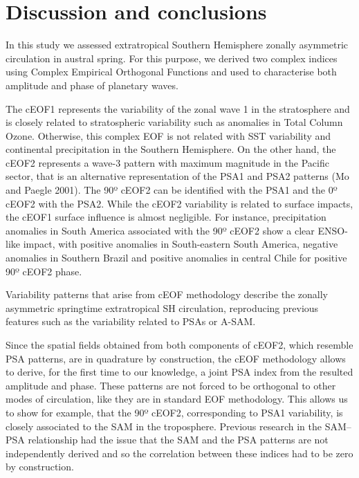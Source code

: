 \documentclass[pdflatex,lineno,sn-basic]{sn-jnl}
\theoremstyle{thmstyleone}%
\theoremstyle{thmstyletwo}%
\theoremstyle{thmstylethree}%
\begin{document}
\hypertarget{discussion}{%
\section{Discussion and conclusions}\label{discussion}}

In this study we assessed extratropical Southern Hemisphere zonally asymmetric circulation in austral spring.
For this purpose, we derived two complex indices using Complex Empirical Orthogonal Functions and used to characterise both amplitude and phase of planetary waves.

The cEOF1 represents the variability of the zonal wave 1 in the stratosphere and is closely related to stratospheric variability such as anomalies in Total Column Ozone.
Otherwise, this complex EOF is not related with SST variability and continental precipitation in the Southern Hemisphere.
On the other hand, the cEOF2 represents a wave-3 pattern with maximum magnitude in the Pacific sector, that is an alternative representation of the PSA1 and PSA2 patterns (Mo and Paegle 2001).
The 90º cEOF2 can be identified with the PSA1 and the 0º cEOF2 with the PSA2.
While the cEOF2 variability is related to surface impacts, the cEOF1 surface influence is almost negligible.
For instance, precipitation anomalies in South America associated with the 90º cEOF2 show a clear ENSO-like impact, with positive anomalies in South-eastern South America, negative anomalies in Southern Brazil and positive anomalies in central Chile for positive 90º cEOF2 phase.

Variability patterns that arise from cEOF methodology describe the zonally asymmetric springtime extratropical SH circulation, reproducing previous features such as the variability related to PSAs or A-SAM.

Since the spatial fields obtained from both components of cEOF2, which resemble PSA patterns, are in quadrature by construction, the cEOF methodology allows to derive, for the first time to our knowledge, a joint PSA index from the resulted amplitude and phase.
These patterns are not forced to be orthogonal to other modes of circulation, like they are in standard EOF methodology.
This allows us to show for example, that the 90º cEOF2, corresponding to PSA1 variability, is closely associated to the SAM in the troposphere.
Previous research in the SAM--PSA relationship had the issue that the SAM and the PSA patterns are not independently derived and so the correlation between these indices had to be zero by construction.
\end{document}
